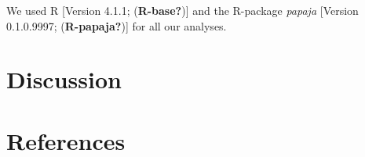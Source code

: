 \documentclass[
  english,
  man]{apa6}
\begin{document}
We used R {[}Version 4.1.1; (\textbf{R-base?}){]} and the R-package \emph{papaja} {[}Version 0.1.0.9997; (\textbf{R-papaja?}){]} for all our analyses.

\hypertarget{discussion}{%
\section{Discussion}\label{discussion}}

\newpage

\hypertarget{references}{%
\section{References}\label{references}}

\begingroup
\setlength{\parindent}{-0.5in}
\setlength{\leftskip}{0.5in}
\end{document}
